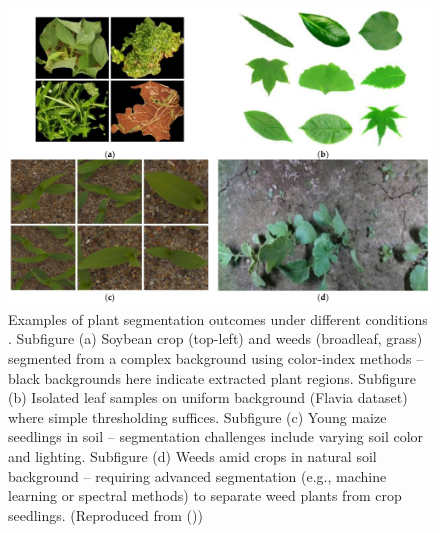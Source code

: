 \documentclass[letterpaper]{report}
\begin{document}
\begin{figure}[h!]
	\centering
	\includegraphics[width=0.5\linewidth]{./figures/segmentation-review.png}
	\caption[Examples of plant segmentation outcomes under different conditions]{Examples of plant segmentation outcomes under different conditions \parencite{Wu2021-gt}. Subfigure (a) Soybean crop (top-left) and weeds (broadleaf, grass) segmented from a complex background using color-index methods – black backgrounds here indicate extracted plant regions. Subfigure (b) Isolated leaf samples on uniform background (Flavia dataset) where simple thresholding suffices. Subfigure (c) Young maize seedlings in soil – segmentation challenges include varying soil color and lighting. Subfigure (d) Weeds amid crops in natural soil background – requiring advanced segmentation (e.g., machine learning or spectral methods) to separate weed plants from crop seedlings. (Reproduced from \citeauthor{Wu2021-gt} (\citeyear{Wu2021-gt}))}
	\label{fig:segmentation-example}
\end{figure}
%
\end{document}
